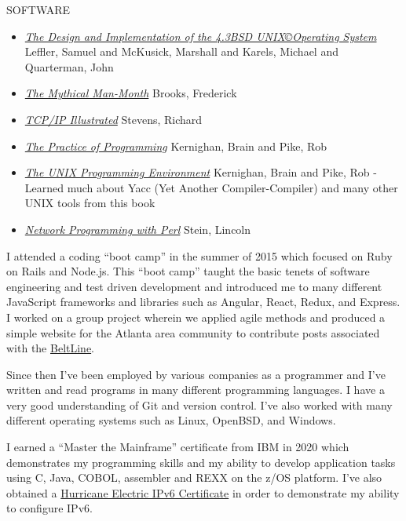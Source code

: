 \documentclass[12pt]{report}
\begin{document}
SOFTWARE
\begin{itemize}
        \item \href{https://archive.org/details/designimplementa0000unse}{\emph {The Design and Implementation of the 4.3BSD UNIX\copyright Operating System}} Leffler, Samuel and McKusick, Marshall and Karels, Michael and Quarterman, John
        \item \href{https://en.wikipedia.org/wiki/The_Mythical_Man-Month}{\emph {The Mythical Man-Month}} Brooks, Frederick
        \item \href{https://en.wikipedia.org/wiki/TCP/IP_Illustrated}{\emph {TCP/IP Illustrated}} Stevens, Richard
        \item \href{https://en.wikipedia.org/wiki/The_Practice_of_Programming}{\emph {The Practice of Programming}} Kernighan, Brain and Pike, Rob
        \item \href{https://en.wikipedia.org/wiki/The_Unix_Programming_Environment}{\emph {The UNIX Programming Environment}} Kernighan, Brain and Pike, Rob - Learned much about Yacc (Yet Another Compiler-Compiler) and many other UNIX tools from this book
        \item \href{https://www.oreilly.com/library/view/network-programming-with/0201615711/}{\emph {Network Programming with Perl}} Stein, Lincoln
\end{itemize}
I attended a coding ``boot camp'' in the summer of 2015 which focused on Ruby on Rails and Node.js. This ``boot camp'' taught the basic tenets of software engineering and test driven development and introduced me to many different JavaScript frameworks and libraries such as Angular, React, Redux, and Express. I worked on a group project wherein we applied agile methods and produced a simple website for the Atlanta area community to contribute posts associated with the \href{https://en.wikipedia.org/wiki/BeltLine}{BeltLine}.

Since then I've been employed by various companies as a programmer and I've written and read programs in many different programming languages. I have a very good understanding of Git and version control. I've also worked with many different operating systems such as Linux, OpenBSD, and Windows.\hfill \break 

I earned a ``Master the Mainframe'' certificate from IBM in 2020 which demonstrates my programming skills and my ability to develop application tasks using C, Java, COBOL, assembler and REXX on the z/OS platform. I've also obtained a \href{https://ipv6.he.net/certification/}{Hurricane Electric IPv6 Certificate} in order to demonstrate my ability to configure IPv6.\hfill \break
\end{document}
